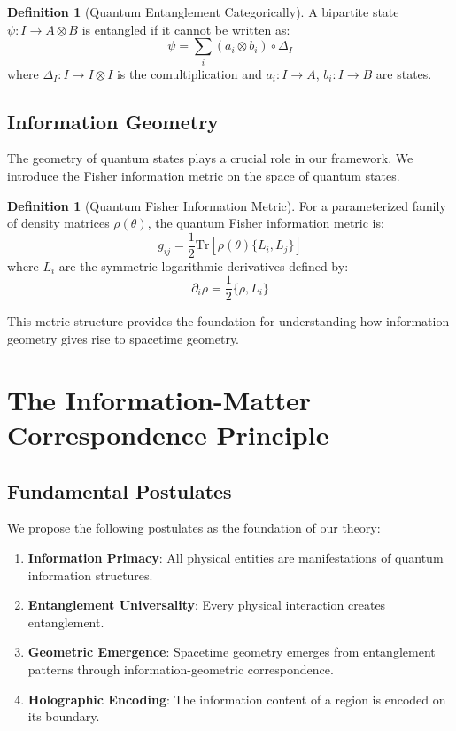 \documentclass[12pt,a4paper]{article}
\newcommand{\Tr}{\mathrm{Tr}}
\theoremstyle{plain}
\theoremstyle{definition}
\newtheorem{definition}[theorem]{Definition}
\theoremstyle{remark}
\begin{document}
\begin{definition}[Quantum Entanglement Categorically]
A bipartite state $\psi: I \to A \otimes B$ is entangled if it cannot be written as:
\[\psi = \sum_i (a_i \otimes b_i) \circ \Delta_I\]
where $\Delta_I: I \to I \otimes I$ is the comultiplication and $a_i: I \to A$, $b_i: I \to B$ are states.
\end{definition}

\subsection{Information Geometry}

The geometry of quantum states plays a crucial role in our framework. We introduce the Fisher information metric on the space of quantum states.

\begin{definition}[Quantum Fisher Information Metric]
For a parameterized family of density matrices $\rho(\theta)$, the quantum Fisher information metric is:
\[g_{ij} = \frac{1}{2}\Tr[\rho(\theta)\{L_i, L_j\}]\]
where $L_i$ are the symmetric logarithmic derivatives defined by:
\[\partial_i \rho = \frac{1}{2}\{\rho, L_i\}\]
\end{definition}

This metric structure provides the foundation for understanding how information geometry gives rise to spacetime geometry.

\section{The Information-Matter Correspondence Principle}

\subsection{Fundamental Postulates}

We propose the following postulates as the foundation of our theory:

\begin{enumerate}
\item \textbf{Information Primacy}: All physical entities are manifestations of quantum information structures.
\item \textbf{Entanglement Universality}: Every physical interaction creates entanglement.
\item \textbf{Geometric Emergence}: Spacetime geometry emerges from entanglement patterns through information-geometric correspondence.
\item \textbf{Holographic Encoding}: The information content of a region is encoded on its boundary.
\end{enumerate}
\end{document}

